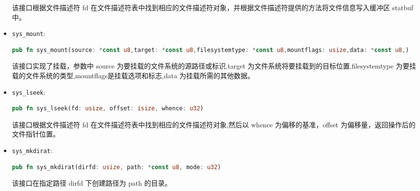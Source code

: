 \begin{itemize}
	该接口根据文件描述符 fd 在文件描述符表中找到相应的文件描述符对象，并根据文件描述符提供的方法将文件信息写入缓冲区 statbuf 中。
	\item \texttt{sys\_mount}: 
	\begin{lstlisting}[language=rust]
	pub fn sys_mount(source: *const u8,target: *const u8,filesystemtype: *const u8,mountflags: usize,data: *const u8,)
	\end{lstlisting}
	该接口实现了挂载，参数中 source 为要挂载的文件系统的源路径或标识,target 为文件系统将要挂载到的目标位置,filesystemtype 为要挂载的文件系统的类型,mountflags是挂载选项和标志,data 为挂载所需的其他数据。
	\item \texttt{sys\_lseek}: 
	\begin{lstlisting}[language=rust]
	pub fn sys_lseek(fd: usize, offset: isize, whence: u32)
	\end{lstlisting}
	该接口根据文件描述符 fd 在文件描述符表中找到相应的文件描述符对象,然后以 whence 为偏移的基准，offset 为偏移量，返回操作后的文件指针位置。
	\item \texttt{sys\_mkdirat}: 
	\begin{lstlisting}[language=rust]
	pub fn sys_mkdirat(dirfd: usize, path: *const u8, mode: u32)
	\end{lstlisting}
	该接口在指定路径 dirfd 下创建路径为 path 的目录。
\end{itemize}
